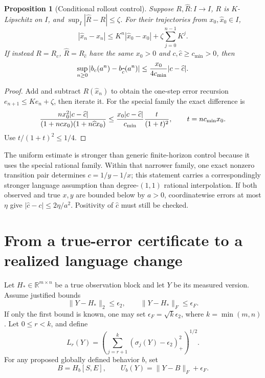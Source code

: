 \documentclass[11pt]{article}
\newtheorem{proposition}[theorem]{Proposition}
\theoremstyle{definition}
\begin{document}
\begin{proposition}[Conditional rollout control]
\label{lr:rollout}
Suppose $R,\widehat R:I\to I$, $R$ is $K$-Lipschitz on $I$, and
$\sup_I|\widehat R-R|\leq\zeta$. For their trajectories from
$x_0,\widehat x_0\in I$,
\[
 |\widehat x_n-x_n|
 \leq K^n|\widehat x_0-x_0|+
       \zeta\sum_{j=0}^{n-1}K^j.
\]
If instead $R=R_c$, $\widehat R=R_{\widehat c}$ have the same
$x_0>0$ and $c,\widehat c\geq c_{\min}>0$, then
\begin{equation}
 \sup_{n\geq0}|b_c(a^n)-b_{\widehat c}(a^n)|
 \leq {x_0\over4c_{\min}}|c-\widehat c|.
 \label{lr:uniform-special-family}
\end{equation}
\end{proposition}
\begin{proof}
Add and subtract $R(\widehat x_n)$ to obtain the one-step error
recursion $e_{n+1}\leq Ke_n+\zeta$, then iterate it. For the special
family the exact difference is
\[
 {n x_0^2|c-\widehat c|\over
 (1+ncx_0)(1+n\widehat c x_0)}
 \leq {x_0|c-\widehat c|\over c_{\min}}
       {t\over(1+t)^2},\qquad t=nc_{\min}x_0.
\]
Use $t/(1+t)^2\leq1/4$.
\end{proof}

The uniform estimate is stronger than generic finite-horizon control
because it uses the special rational family. Within that narrower family,
one exact nonzero transition pair determines
$c=1/y-1/x$; this statement carries a correspondingly stronger language
assumption than degree-$(1,1)$ rational interpolation. If both observed
and true $x,y$ are bounded below by $a>0$, coordinatewise errors at most
$\eta$ give $|\widehat c-c|\leq2\eta/a^2$. Positivity of
$\widehat c$ must still be checked.

\section{From a true-error certificate to a realized language change}
\label{sec:gate}

Let $H_*\in\mathbb R^{m\times n}$ be a true observation block and let
$Y$ be its measured version. Assume justified bounds
\begin{equation}
 \|Y-H_*\|_2\leq\epsilon_2,
 \qquad \|Y-H_*\|_F\leq\epsilon_F.
 \label{lr:noise-event}
\end{equation}
If only the first bound is known, one may set
$\epsilon_F=\sqrt{k}\epsilon_2$, where $k=\min(m,n)$.
Let $0\leq r<k$, and define
\begin{equation}
 L_r(Y)=\left(\sum_{j=r+1}^{k}
        (\sigma_j(Y)-\epsilon_2)_+^2\right)^{1/2}.
 \label{lr:lower}
\end{equation}
For any proposed globally defined behavior $b$, set
\begin{equation}
 B=H_b[S,E],\qquad U_b(Y)=\|Y-B\|_F+\epsilon_F.
 \label{lr:upper}
\end{equation}
\end{document}
